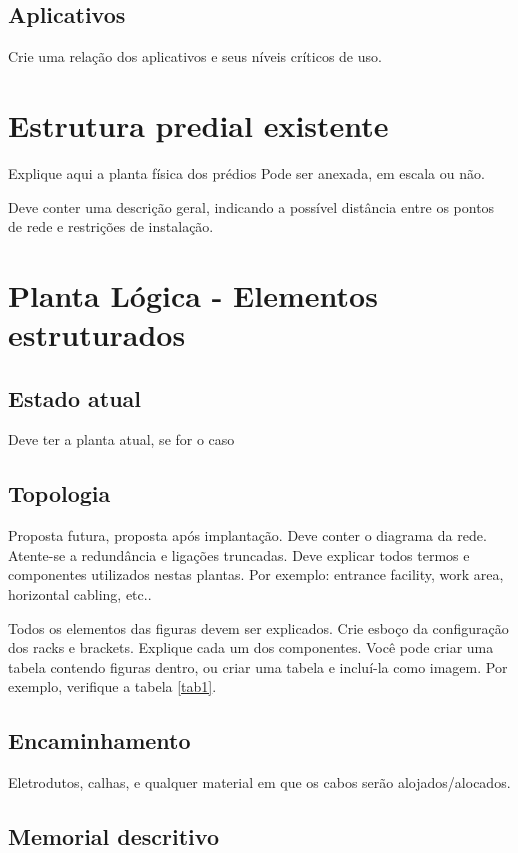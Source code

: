 \documentclass[	DIV=calc,%
							paper=a4,%
							fontsize=12pt,%
							onecolumn]{scrartcl}	 					%
\begin{document}
\subsection{Aplicativos}
Crie uma relação dos aplicativos e seus níveis críticos de uso.


\section{Estrutura predial existente}

Explique aqui a planta física dos prédios
Pode ser anexada, em escala ou não.

Deve conter uma descrição geral, indicando a possível distância entre os pontos de rede e restrições de instalação.

\section{Planta Lógica - Elementos estruturados}

\subsection{Estado atual}
Deve ter a planta atual, se for o caso

\subsection{Topologia}
Proposta futura, proposta após implantação.
Deve conter o diagrama da rede. Atente-se a redundância  e ligações truncadas.
Deve explicar todos termos e componentes utilizados nestas plantas. Por exemplo: entrance facility, work area, horizontal cabling, etc..

Todos os elementos das figuras devem ser explicados. 
Crie esboço da configuração dos racks e brackets. Explique cada um dos componentes. Você pode criar uma tabela contendo figuras dentro, ou criar uma tabela e incluí-la como imagem. Por exemplo, verifique a tabela \ref{tab1}.



\subsection{Encaminhamento}
Eletrodutos, calhas, e qualquer material em que os cabos serão alojados/alocados.

\subsection{Memorial descritivo}
\end{document}
